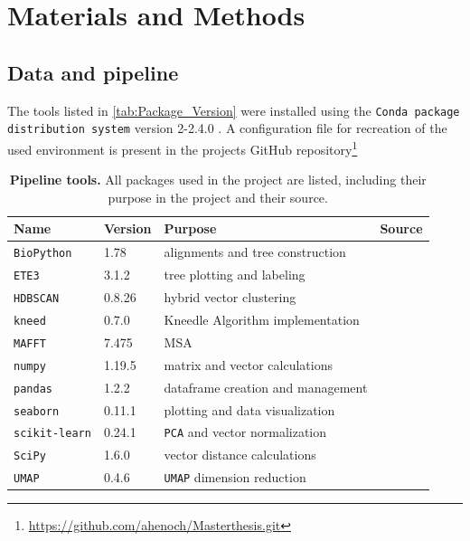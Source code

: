 \chapter{Materials and Methods} \label{chap:Materials_and_Methods}

\section{Data and pipeline}

The tools listed in \autoref{tab:Package_Version} were installed using the \texttt{Conda package distribution system} version 2-2.4.0 \autocite{anaconda_software_distribution_anaconda_2020}. A configuration file for recreation of the used environment is present in the projects GitHub repository\footnote{\url{https://github.com/ahenoch/Masterthesis.git}}

\begin{table}[hbt]
    \footnotesize
    \centering
    \caption[Pipeline tools]{\textbf{Pipeline tools.} All packages used in the project are listed, including their purpose in the project and their source.}
    \label{tab:Package_Version}
    \begin{tabular*}{0.75\textwidth}{@{\extracolsep{\fill}\hspace{6pt}}llll}
        \toprule
        \textbf{Name} & \textbf{Version} & \textbf{Purpose} & \textbf{Source}\\
        \midrule
        \texttt{BioPython} & 1.78 & alignments and tree construction & \autocite{cock_biopython_2009}\\
        \texttt{ETE3} & 3.1.2 & tree plotting and labeling & \autocite{huerta-cepas_ete_2016}\\
        \texttt{HDBSCAN} & 0.8.26 & hybrid vector clustering & \autocite{mcinnes_hdbscan_2017}\\
        \texttt{kneed} & 0.7.0 & Kneedle Algorithm implementation & \autocite{satopaa_finding_2011}\\
        \texttt{MAFFT} & 7.475 & \acrlong{MSA} & \autocite{katoh_mafft_2013}\\
        \texttt{numpy} & 1.19.5 & matrix and vector calculations & \autocite{harris_array_2020}\\
        \texttt{pandas} & 1.2.2 & dataframe creation and management & \autocite{mckinney_data_2010}\\
        \texttt{seaborn} & 0.11.1 & plotting and data visualization & \autocite{waskom_seaborn_2021}\\
        \texttt{scikit-learn} & 0.24.1 & \texttt{PCA} and vector normalization & \autocite{pedregosa_scikit-learn_2011}\\
        \texttt{SciPy} & 1.6.0 & vector distance calculations & \autocite{scipy_10_contributors_scipy_2020}\\
        \texttt{UMAP} & 0.4.6 & \texttt{UMAP} dimension reduction & \autocite{mcinnes_umap_2020}\\
        \bottomrule
    \end{tabular*}
\end{table}


